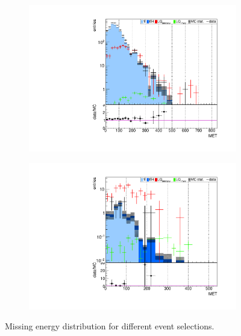 \begin{figure}
\begin{subfigure}[t]{0.49\textwidth}
                \end{subfigure}
                \begin{subfigure}[t]{0.49\textwidth}
                \includegraphics[width=\textwidth]{figures/plots/kinLQ75/MET_2j1b_1tau.pdf}
                \label{MET:1b1tau}
                \end{subfigure}
                \begin{subfigure}[t]{0.49\textwidth}
                \includegraphics[width=\textwidth]{figures/plots/kinLQ75/MET_2j1b_2tau.pdf}
                \label{MET:1b2tau}
                \end{subfigure}
\caption[Missing energy distribution for different event selections.]{Missing energy distribution for different event selections.}
\label{MET}
\end{figure}
